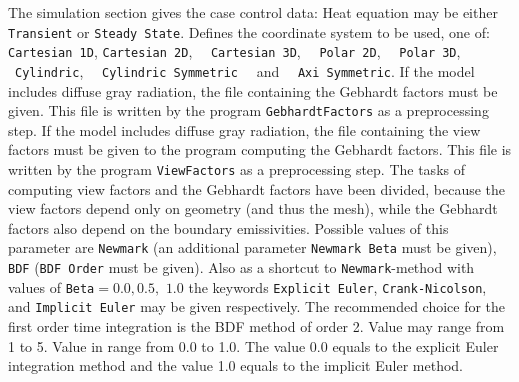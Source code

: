 The simulation section gives the case control data:
\sifbegin
{} Heat equation may be either 
{\tt Transient} or {\tt Steady State}.
 Defines the coordinate system to be used, one of:
{\tt Cartesian 1D}, {\tt Cartesian 2D},~ ~{\tt Cartesian 3D},~ ~{\tt Polar 2D},~ 
~{\tt Polar 3D},~ ~{\tt Cy\-lin\-dric},~ ~{\tt Cylindric Symmetric}~
~and~ ~{\tt Axi Symmetric}.
If the model includes diffuse gray radiation, the file containing the Gebhardt factors
must be given. This file is written by the program {\tt GebhardtFactors} as a preprocessing step.
If the model includes diffuse gray radiation, the file containing the view factors
must be given to the program computing the Gebhardt factors. 
This file is written by the program {\tt ViewFactors} as a
preprocessing step. The tasks of computing view factors and the Gebhardt 
factors have been divided, because
the view factors depend only on geometry (and thus the mesh), while the Gebhardt factors also depend on
the boundary emissivities. 
Possible values of this parameter are {\tt Newmark} (an additional
parameter {\tt Newmark Beta} must be given), {\tt BDF} ({\tt BDF Order} must be given). Also as a
shortcut to {\tt Newmark}-method with values of {\tt Beta}$=0.0, 0.5,$ $1.0$ the keywords 
{\tt Explicit Euler}, {\tt Crank-Nicolson}, and {\tt Implicit Euler} may be given respectively.
The recommended choice for the first order time integration is the BDF method of order 2.
Value may range from 1 to 5.
 Value in range from 0.0 to 1.0. The value 0.0 equals to
the explicit Euler integration method and the value 1.0 equals to the implicit Euler method. 
\sifend

